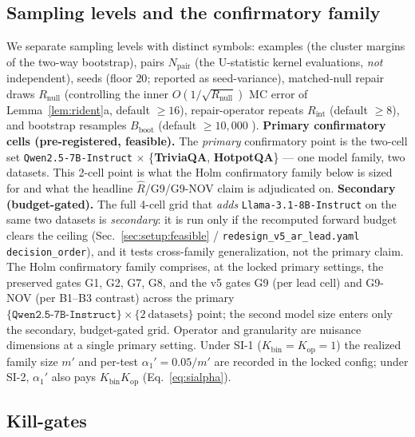 \documentclass[11pt]{article}
\theoremstyle{plain}
\theoremstyle{definition}
\newcommand{\Rhat}{\widehat{R}}
\begin{document}
\subsection{Sampling levels and the confirmatory family}\label{sec:setup:family}

We separate sampling levels with distinct symbols: examples (the cluster margins of
the two-way bootstrap), pairs $N_{\mathrm{pair}}$ (the U-statistic kernel
evaluations, \emph{not} independent), seeds (floor $20$; reported as seed-variance),
matched-null repair draws $R_{\mathrm{null}}$ (controlling the inner
$O(1/\sqrt{R_{\mathrm{null}}})$ MC error of Lemma~\ref{lem:rident}a, default
$\ge16$), repair-operator repeats $R_{\mathrm{int}}$ (default $\ge8$), and bootstrap
resamples $B_{\mathrm{boot}}$ (default $\ge10{,}000$ \cite{efron1994bootstrap}). \textbf{Primary confirmatory cells (pre-registered, feasible).} The \emph{primary}
confirmatory point is the two-cell set
\texttt{Qwen2.5-7B-Instruct} $\times$ \{\textbf{TriviaQA}, \textbf{HotpotQA}\} ---
one model family, two datasets. This 2-cell point is what the Holm confirmatory
family below is sized for and what the headline $\Rhat$/G9/G9-NOV claim is
adjudicated on. \textbf{Secondary (budget-gated).} The full 4-cell grid that
\emph{adds} \texttt{Llama-3.1-8B-Instruct} on the same two datasets is
\emph{secondary}: it is run only if the recomputed forward budget clears the
ceiling (Sec.~\ref{sec:setup:feasible} / \texttt{redesign\_v5\_ar\_lead.yaml}
\texttt{decision\_order}), and it tests cross-family generalization, not the
primary claim. The
Holm confirmatory family \cite{holm1979simple} comprises, at the locked primary
settings, the preserved gates G1, G2, G7, G8, and the v5 gates G9 (per lead cell)
and G9-NOV (per B1--B3 contrast) across the primary $\{\texttt{Qwen2.5-7B-Instruct}\}
\times \{2\ \text{datasets}\}$ point; the second model size enters only the secondary,
budget-gated grid. Operator and granularity are nuisance dimensions at a single
primary setting. Under SI-1 ($K_{\mathrm{bin}}=K_{\mathrm{op}}=1$) the realized
family size $m'$ and per-test $\alpha_1'=0.05/m'$ are recorded in the locked config;
under SI-2, $\alpha_1'$ also pays $K_{\mathrm{bin}}K_{\mathrm{op}}$ (Eq.~\ref{eq:sialpha}).

\subsection{Kill-gates}\label{sec:setup:gates}
\end{document}
